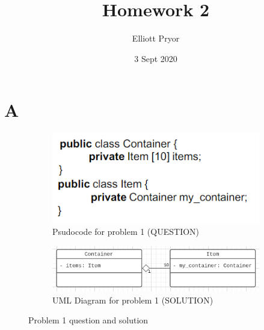 \documentclass[11pt]{article}
\title{Homework 2}
\author{Elliott Pryor}
\date{3 Sept 2020}
\begin{document}
\maketitle

\section*{A}


\begin{figure}[H]
    \centering
    \begin{subfigure}{0.28\textwidth}
		\centering
		\includegraphics[width=\textwidth]{./pics/prob1_prob.png}
		\caption{Psudocode for problem 1 (QUESTION)}
		\label{fig:prob1_prob}
	\end{subfigure}
	\begin{subfigure}{0.7\textwidth}
		\centering
		\includegraphics[width=\textwidth]{./pics/prob1_sol.png}
		\caption{UML Diagram for problem 1 (SOLUTION)}
		\label{fig:prob1_sol}
	\end{subfigure}
    \caption{Problem 1 question and solution}
    \label{fig:prob1}
\end{figure}
\end{document}
